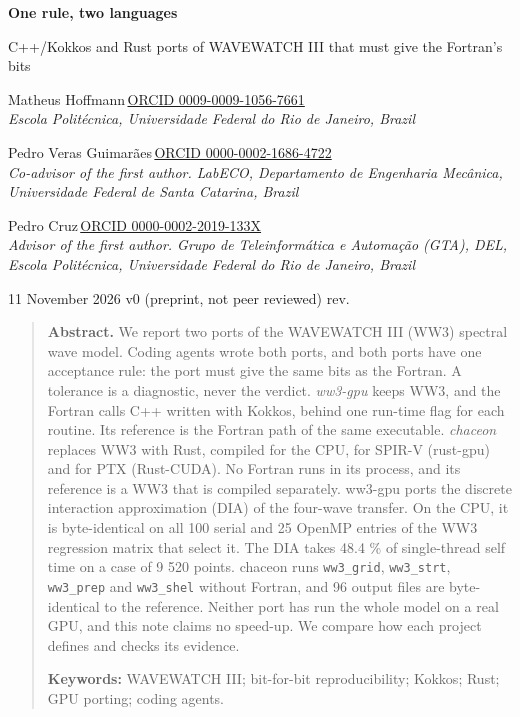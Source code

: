 \documentclass[10pt,a4paper,]{article}
\newcommand{\revision}{\IfFileExists{.current-revision}{}{unversioned}}
\begin{document}
\begin{center}
{\LARGE\bfseries One rule, two languages\par}
\vspace{4pt}
{\large C++/Kokkos and Rust ports of WAVEWATCH III that must give the
Fortran's bits\par}
\vspace{12pt}
{\large Matheus
Hoffmann}\,\href{https://orcid.org/0009-0009-1056-7661}{\footnotesize\color{fabric}ORCID 0009-0009-1056-7661}\\
{\small\itshape Escola Politécnica, Universidade Federal do Rio de
Janeiro, Brazil}\par\vspace{4pt}
{\large Pedro Veras
Guimarães}\,\href{https://orcid.org/0000-0002-1686-4722}{\footnotesize\color{fabric}ORCID 0000-0002-1686-4722}\\
{\small\itshape Co-advisor of the first author. LabECO, Departamento de
Engenharia Mecânica, Universidade Federal de Santa Catarina,
Brazil}\par\vspace{4pt}
{\large Pedro
Cruz}\,\href{https://orcid.org/0000-0002-2019-133X}{\footnotesize\color{fabric}ORCID 0000-0002-2019-133X}\\
{\small\itshape Advisor of the first author. Grupo de Teleinformática e
Automação (GTA), DEL, Escola Politécnica, Universidade Federal do Rio de
Janeiro, Brazil}\par\vspace{4pt}
\vspace{6pt}
{\small 11 November 2026 \textperiodcentered{} v0 (preprint, not peer
reviewed) \textperiodcentered{} rev.~\revision\par}
\end{center}

\begin{quote}
\small\textbf{Abstract.} We report two ports of the WAVEWATCH III (WW3)
spectral wave model. Coding agents wrote both ports, and both ports have
one acceptance rule: the port must give the same bits as the Fortran. A
tolerance is a diagnostic, never the verdict. \emph{ww3-gpu} keeps WW3,
and the Fortran calls C++ written with Kokkos, behind one run-time flag
for each routine. Its reference is the Fortran path of the same
executable. \emph{chaceon} replaces WW3 with Rust, compiled for the CPU,
for SPIR-V (rust-gpu) and for PTX (Rust-CUDA). No Fortran runs in its
process, and its reference is a WW3 that is compiled separately. ww3-gpu
ports the discrete interaction approximation (DIA) of the four-wave
transfer. On the CPU, it is byte-identical on all 100 serial and 25
OpenMP entries of the WW3 regression matrix that select it. The DIA
takes 48.4 \% of single-thread self time on a case of 9 520 points.
chaceon runs \texttt{ww3\_grid}, \texttt{ww3\_strt}, \texttt{ww3\_prep}
and \texttt{ww3\_shel} without Fortran, and 96 output files are
byte-identical to the reference. Neither port has run the whole model on
a real GPU, and this note claims no speed-up. We compare how each
project defines and checks its evidence.

\textbf{Keywords:} WAVEWATCH III; bit-for-bit
reproducibility; Kokkos; Rust; GPU porting; coding agents.
\end{quote}
\end{document}
